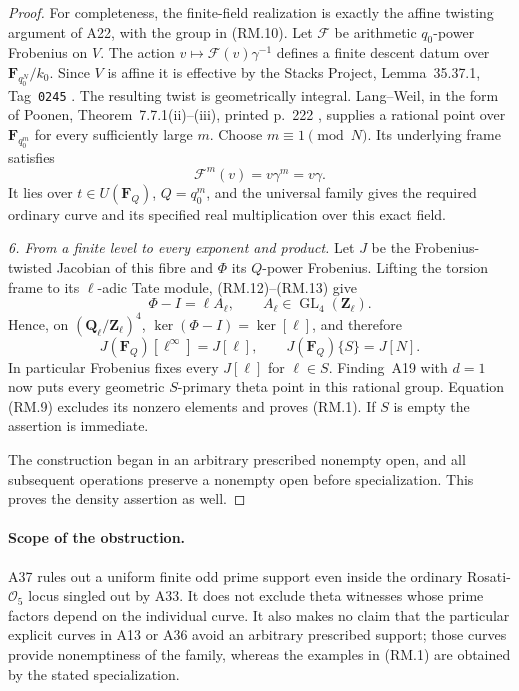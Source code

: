 \begin{proof}
For completeness, the finite-field realization is exactly the
affine twisting argument of A22, with the group in (RM.10).
Let $\mathcal F$ be arithmetic $q_0$-power Frobenius on $V$.
The action $v\mapsto\mathcal F(v)\gamma^{-1}$ defines a
finite descent datum over $\mathbf F_{q_0^N}/k_0$.
Since $V$ is affine it is effective by the Stacks Project,
Lemma~35.37.1, Tag~\texttt{0245} \cite{Stacks0245}.
The resulting twist is geometrically integral.  Lang--Weil,
in the form of Poonen, Theorem~7.7.1(ii)--(iii), printed
p.~222 \cite{Poonen2017RPV}, supplies a rational point over
$\mathbf F_{q_0^m}$ for every sufficiently large $m$.
Choose $m\equiv1\pmod N$.  Its underlying frame satisfies
\[
              \mathcal F^m(v)=v\gamma^m=v\gamma.               \tag{RM.13}
\]
It lies over $t\in U(\mathbf F_Q)$, $Q=q_0^m$, and the
universal family gives the required ordinary curve and
its specified real multiplication over this exact field.

\emph{6. From a finite level to every exponent and product.}
Let $J$ be the Frobenius-twisted Jacobian of this fibre and
$\Phi$ its $Q$-power Frobenius.  Lifting the torsion frame
to its $\ell$-adic Tate module, (RM.12)--(RM.13) give
\[
             \Phi-I=\ell A_\ell,
             \qquad A_\ell\in\operatorname{GL}_4(\mathbf Z_\ell).
                                                               \tag{RM.14}
\]
Hence, on $(\mathbf Q_\ell/\mathbf Z_\ell)^4$,
$\ker(\Phi-I)=\ker[\ell]$, and therefore
\[
 J(\mathbf F_Q)[\ell^\infty]=J[\ell],\qquad
                       J(\mathbf F_Q)\{S\}=J[N].              \tag{RM.15}
\]
In particular Frobenius fixes every $J[\ell]$ for
$\ell\in S$.  Finding~A19 with $d=1$ now puts every
geometric $S$-primary theta point in this rational group.
Equation (RM.9) excludes its nonzero elements and proves
(RM.1).  If $S$ is empty the assertion is immediate.

The construction began in an arbitrary prescribed nonempty
open, and all subsequent operations preserve a nonempty
open before specialization.  This proves the density
assertion as well.
\end{proof}

\paragraph{Scope of the obstruction.}
A37 rules out a uniform finite odd prime support even inside
the ordinary Rosati-$\mathcal O_5$ locus singled out by A33.
It does not exclude theta witnesses whose prime factors
depend on the individual curve.  It also makes no claim
that the particular explicit curves in A13 or A36 avoid
an arbitrary prescribed support; those curves provide
nonemptiness of the family, whereas the examples in
(RM.1) are obtained by the stated specialization.
